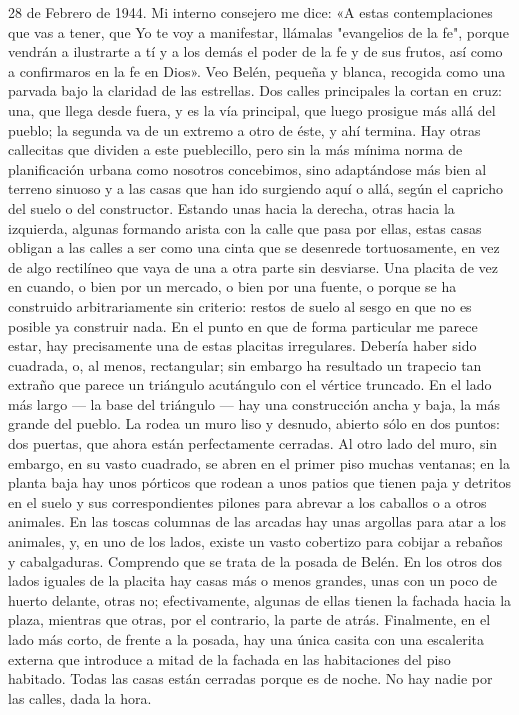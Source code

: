 \documentclass[12pt]{book} %
\begin{document}
28 de Febrero de 1944. 
Mi interno consejero me dice: 
«A estas contemplaciones que vas a tener, que Yo te voy a manifestar, llámalas "evangelios de la fe", porque vendrán a 
ilustrarte a tí y a los demás el poder de la fe y de sus frutos, así como a confirmaros en la fe en Dios». 
Veo Belén, pequeña y blanca, recogida como una parvada bajo la claridad de las estrellas. Dos calles principales la 
cortan en cruz: una, que llega desde fuera, y es la vía principal, que luego prosigue más allá del pueblo; la segunda va de un extremo a otro de éste, y ahí termina. Hay otras callecitas que dividen a este pueblecillo, pero sin la más mínima norma de planificación urbana como nosotros concebimos, sino adaptándose más bien al terreno sinuoso y a las casas que han ido surgiendo aquí o allá, según el capricho del suelo o del constructor. Estando unas hacia la derecha, otras hacia la izquierda, algunas formando arista con la calle que pasa por ellas, estas casas obligan a las calles a ser como una cinta que se desenrede tortuosamente, en vez de algo rectilíneo que vaya de una a otra parte sin desviarse. Una placita de vez en cuando, o bien por un mercado, o bien por una fuente, o porque se ha construido arbitrariamente sin criterio: restos de suelo al sesgo en que no es posible ya construir nada. 
En el punto en que de forma particular me parece estar, hay precisamente una de estas placitas irregulares. Debería haber sido cuadrada, o, al menos, rectangular; sin embargo ha resultado un trapecio tan extraño que parece un triángulo acutángulo con el vértice truncado. En el lado más largo — la base del triángulo — hay una construcción ancha y baja, la más grande del pueblo. La rodea un muro liso y desnudo, abierto sólo en dos puntos: dos puertas, que ahora están perfectamente cerradas. Al otro lado del muro, sin embargo, en su vasto cuadrado, se abren en el primer piso muchas ventanas; en la planta baja hay unos pórticos que rodean a unos patios que tienen paja y detritos en el suelo y sus correspondientes pilones para abrevar a los caballos o a otros animales. En las toscas columnas de las arcadas hay unas argollas para atar a los animales, y, en uno de los lados, existe un vasto cobertizo para cobijar a rebaños y cabalgaduras. Comprendo que se trata de la posada de Belén. 
En los otros dos lados iguales de la placita hay casas más o menos grandes, unas con un poco de huerto delante, otras 
no; efectivamente, algunas de ellas tienen la fachada hacia la plaza, mientras que otras, por el contrario, la parte de atrás. Finalmente, en el lado más corto, de frente a la posada, hay una única casita con una escalerita externa que introduce a mitad de la fachada en las habitaciones del piso habitado. Todas las casas están cerradas porque es de noche. No hay nadie por las calles, dada la hora. 
\end{document}
